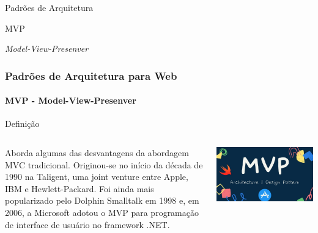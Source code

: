 \documentclass[
	10pt, %
	t, %
]{beamer}
\begin{document}
\begin{frame}
	\begin{center}
		
		\bigskip\bigskip\bigskip\bigskip %
		{\Large Padrões de Arquitetura}
		
		\bigskip\bigskip %
		{\Huge MVP}
		
		\smallskip
		{\small \textit{Model-View-Presenver}}
	\end{center}

\end{frame}

\begin{frame}
	\frametitle{Padrões de Arquitetura para Web}
	\framesubtitle{MVP - Model-View-Presenver}

	\begin{block}{Definição}
	\begin{columns}[c] %
			\begin{column}{0.8\textwidth} %
				Aborda algumas das desvantagens da abordagem MVC tradicional. Originou-se no início da década de 1990 na Taligent, uma joint venture entre Apple, IBM e Hewlett-Packard. Foi ainda mais popularizado pelo Dolphin Smalltalk em 1998 e, em 2006, a Microsoft adotou o MVP para programação de interface de usuário no framework .NET.
			\end{column}

			\begin{column}{0.2\textwidth} %
				\includegraphics[width=0.9\linewidth]{Images/mvp_logo.jpg}
			\end{column}
		\end{columns}
	\end{block}

\end{frame}
\end{document}
